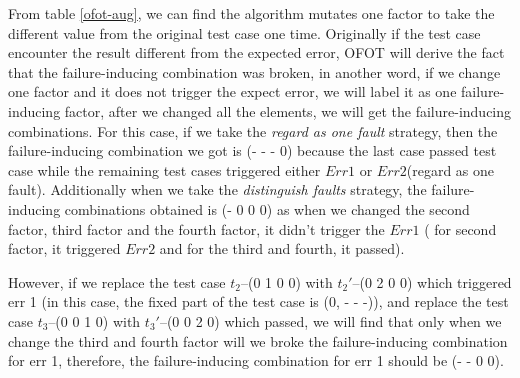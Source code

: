 \documentclass{sig-alternate}
\begin{document}
From table \ref{ofot-aug}, we can find the algorithm mutates one factor to take the different value from the original test case one time. Originally if the test case encounter the result different from the expected error, OFOT will derive the fact that the failure-inducing combination was broken, in another word, if we change one factor and it does not trigger the expect error, we will label it as one failure-inducing factor, after we changed all the elements, we will get the failure-inducing combinations. For this case, if we take the \emph{regard as one fault} strategy, then the failure-inducing combination we got is (- - - 0) because the last case passed test case while the remaining test cases triggered either $Err 1$ or $Err 2$(regard as one fault).  Additionally when we take the \emph{distinguish faults} strategy, the failure-inducing combinations obtained is (- 0 0 0) as when we changed the second factor, third factor and the fourth factor, it didn't trigger the $Err 1$ ( for second factor, it triggered $Err 2$ and for the third and fourth, it passed).


However, if we replace the test case $t_{2}$--(0 1 0 0) with $t_{2}'$--(0 2 0 0) which triggered err 1 (in this case, the fixed part of the test case is (0, - - -)), and replace the test case $t_{3}$--(0 0 1 0) with $t_{3}'$--(0 0 2 0) which passed, we will find that only when we change the third and fourth factor will we broke the failure-inducing combination for err 1, therefore,  the failure-inducing combination for err 1 should be (- - 0 0).
\end{document}
